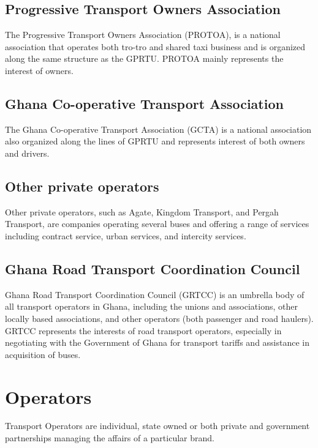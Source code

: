 \documentclass[oneside,12pt]{book}
\begin{document}
\subsection{Progressive Transport Owners Association}
The Progressive Transport Owners Association (PROTOA), is a national association that operates both tro-tro and shared taxi business and is organized along the same structure as the GPRTU. PROTOA mainly represents the interest of owners. 

\subsection{Ghana Co-operative Transport Association}
The Ghana Co-operative Transport Association (GCTA) is a national association also organized along the lines of GPRTU and represents interest of both owners and drivers.

\subsection{Other private operators}
Other private operators, such as Agate, Kingdom Transport, and Pergah Transport, are companies operating several buses and offering a range of services including contract service, urban services, and intercity services.

\subsection{Ghana Road Transport Coordination Council}
Ghana Road Transport Coordination Council (GRTCC) is an umbrella body of all transport operators in Ghana, including the unions and associations, other locally based associations, and other operators (both passenger and road haulers). GRTCC represents the interests of road transport operators, especially in negotiating with the Government of Ghana for transport tariffs and assistance in acquisition of buses.

\section{Operators}
Transport Operators are individual, state owned or both private and government partnerships managing the affairs of a particular brand.
\end{document}
